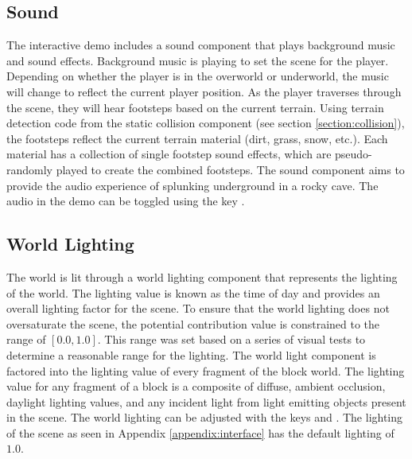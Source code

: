 \documentclass[a4paper,11pt,titlepage]{scrartcl}
\begin{document}
\subsection{Sound}
\label{section:sound}
The interactive demo includes a sound component that plays background music and sound effects. Background music is playing to set the scene for the player. Depending on whether the player is in the overworld or underworld, the music will change to reflect the current player position. As the player traverses through the scene, they will hear footsteps based on the current terrain. Using terrain detection code from the static collision component (see section \ref{section:collision}), the footsteps reflect the current terrain material (dirt, grass, snow, etc.). Each material has a collection of single footstep sound effects, which are pseudo-randomly played to create the combined footsteps. The sound component aims to provide the audio experience of splunking underground in a rocky cave.
\vskip 2.5mm\noindent
The audio in the demo can be toggled using the key .
    
\subsection{World Lighting}
\label{section:lighting}
The world is lit through a world lighting component that represents the lighting of the world. The lighting value is known as the time of day and provides an overall lighting factor for the scene. To ensure that the world lighting does not oversaturate the scene, the potential contribution value is constrained to the range of $[0.0, 1.0]$. This range was set based on a series of visual tests to determine a reasonable range for the lighting. The world light component is factored into the lighting value of every fragment of the block world. The lighting value for any fragment of a block is a composite of diffuse, ambient occlusion, daylight lighting values, and any incident light from light emitting objects present in the scene. 
\vskip 2.5mm\noindent
The world lighting can be adjusted with the keys  and . The lighting of the scene as seen in Appendix \ref{appendix:interface} has the default lighting of $1.0$.
    
\end{document}
